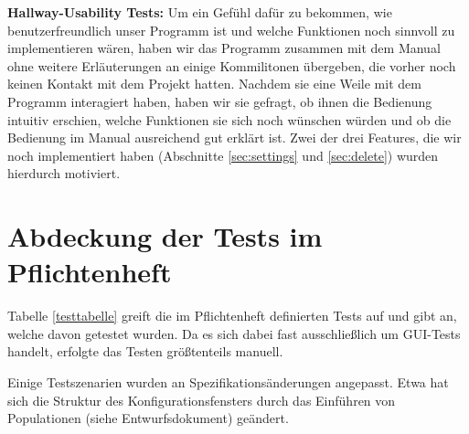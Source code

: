 \documentclass[parskip=full,11pt,openany]{scrreprt}
\begin{document}
\textbf{Hallway-Usability Tests: } Um ein Gefühl dafür zu bekommen, wie benutzerfreundlich unser Programm ist und welche Funktionen noch sinnvoll zu implementieren wären, haben wir das Programm zusammen mit dem Manual ohne weitere Erläuterungen an einige Kommilitonen übergeben, die vorher noch keinen Kontakt mit dem Projekt hatten. Nachdem sie eine Weile mit dem Programm interagiert haben, haben wir sie gefragt, ob ihnen die Bedienung intuitiv erschien, welche Funktionen sie sich noch wünschen würden und ob die Bedienung im Manual ausreichend gut erklärt ist. Zwei der drei Features, die wir noch implementiert haben (Abschnitte \ref{sec:settings} und \ref{sec:delete}) wurden hierdurch motiviert.

\section{Abdeckung der Tests im Pflichtenheft}

Tabelle \ref{testtabelle} greift die im Pflichtenheft definierten Tests auf und gibt an, welche davon getestet wurden. Da es sich dabei fast ausschließlich um GUI-Tests handelt, erfolgte das Testen größtenteils manuell.

Einige Testszenarien wurden an Spezifikationsänderungen angepasst. Etwa hat sich die Struktur des Konfigurationsfensters durch das Einführen von Populationen (siehe Entwurfsdokument) geändert.
\end{document}
